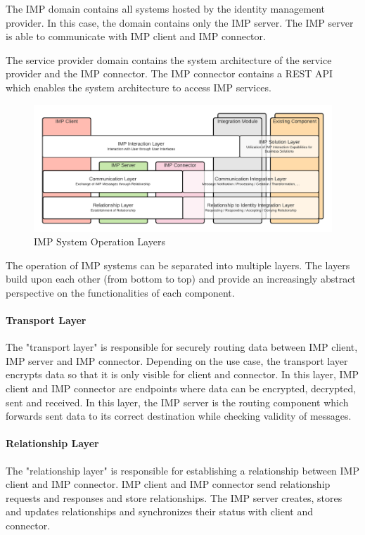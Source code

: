 The IMP domain contains all systems hosted by the identity management provider. In this case, the domain contains only the IMP server. The IMP server is able to communicate with IMP client and IMP connector.

The service provider domain contains the system architecture of the service provider and the IMP connector. The IMP connector contains a REST API which enables the system architecture to access IMP services.

\begin{figure}[h]
\caption{IMP System Operation Layers}
    \centering
    \includegraphics[scale=0.6]{Diagrams/IMP Layer Diagram.pdf}
\end{figure}

The operation of IMP systems can be separated into multiple layers. The layers build upon each other (from bottom to top) and provide an increasingly abstract perspective on the functionalities of each component.

\paragraph{Transport Layer}

The "transport layer" is responsible for securely routing data between IMP client, IMP server and IMP connector. Depending on the use case, the transport layer encrypts data so that it is only visible for client and connector. In this layer, IMP client and IMP connector are endpoints where data can be encrypted, decrypted, sent and received. In this layer, the IMP server is the routing component which forwards sent data to its correct destination while checking validity of messages.

\paragraph{Relationship Layer}

The "relationship layer" is responsible for establishing a relationship between IMP client and IMP connector. IMP client and IMP connector send relationship requests and responses and store relationships. The IMP server creates, stores and updates relationships and synchronizes their status with client and connector.

